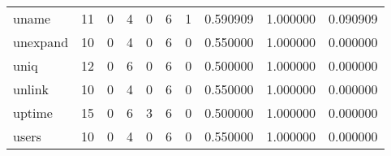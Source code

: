 \begin{tabular}{lrrrrrrrrr}
uname     &                                       11 &                                                  0 &                                                  4 &                                                  0 &                                                  6 &                                                  1 &                                           0.590909 &                               1.000000 &                             0.090909 \\
unexpand  &                                       10 &                                                  0 &                                                  4 &                                                  0 &                                                  6 &                                                  0 &                                           0.550000 &                               1.000000 &                             0.000000 \\
uniq      &                                       12 &                                                  0 &                                                  6 &                                                  0 &                                                  6 &                                                  0 &                                           0.500000 &                               1.000000 &                             0.000000 \\
unlink    &                                       10 &                                                  0 &                                                  4 &                                                  0 &                                                  6 &                                                  0 &                                           0.550000 &                               1.000000 &                             0.000000 \\
uptime    &                                       15 &                                                  0 &                                                  6 &                                                  3 &                                                  6 &                                                  0 &                                           0.500000 &                               1.000000 &                             0.000000 \\
users     &                                       10 &                                                  0 &                                                  4 &                                                  0 &                                                  6 &                                                  0 &                                           0.550000 &                               1.000000 &                             0.000000 \\

\end{tabular}
